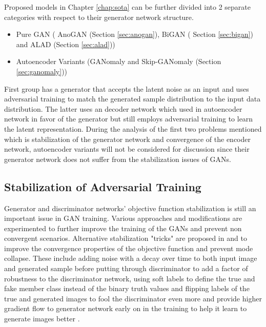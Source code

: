 Proposed models in Chapter \ref{chap:sota} can be further divided into 2 separate categories with
respect to their generator network structure. 
\begin{itemize}
	\item Pure GAN ( AnoGAN (Section \ref{sec:anogan}), BiGAN ( Section \ref{sec:bigan}) and ALAD (Section \ref{sec:alad}))
	\item Autoencoder Variants (GANomaly and Skip-GANomaly (Section \ref{sec:ganomaly}))
\end{itemize}

First group has a generator that accepts the latent noise as an input and uses adversarial training to
match the generated sample distribution to the input data distribution. The latter uses an
decoder network which used in autoencoder network in favor of the generator but still employs 
adversarial training to learn the latent representation. During the analysis of the first two problems mentioned 
which is stabilization of the generator network and convergence of the encoder network, autoencoder 
variants will not be considered for discussion since their generator network does not suffer from the
stabilization issues of GANs.


\subsection{Stabilization of Adversarial Training}

Generator and discriminator networks' objective function stabilization is still an important issue in GAN
training. Various approaches and modifications are experimented to further improve the training of
the GANs and prevent non convergent scenarios. Alternative stabilization "tricks" are proposed in 
\cite{methods} and \cite{fm} to improve the convergence properties of the objective function and prevent
mode collapse. These include adding noise with a decay over time to both input image and generated
sample before putting through discriminator to add a factor of robustness to the discriminator network,
using soft labels to define the true and fake member class instead of the binary truth values and
flipping labels of the true and generated images to fool the discriminator even more and provide
higher gradient flow to generator network early on in the training to help it learn to generate images
better \cite{fm}. 

